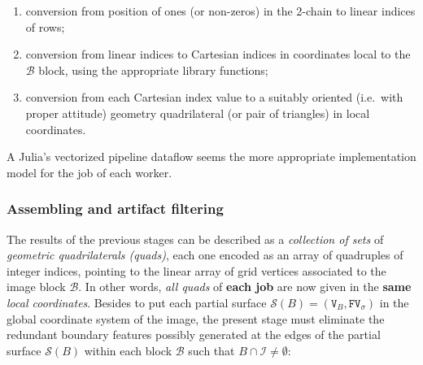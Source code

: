 \documentclass[11pt, oneside]{amsart}   	%
\begin{document}
\begin{enumerate}

\item conversion from position of ones (or non-zeros) in the 2-chain to linear indices of rows;

\item conversion from linear indices to Cartesian indices in coordinates local to the $\mathcal{B}$ block, using the appropriate library functions;

\item conversion from each Cartesian index value to a suitably oriented (i.e.~with proper attitude) geometry quadrilateral (or pair of triangles) in local coordinates.

\end{enumerate}

A Julia's vectorized pipeline dataflow seems the more appropriate implementation model for the job of each worker.

\subsubsection*{Assembling and artifact filtering}\label{sec:artifact-filtering}
The results of the previous stages can be described as a \emph{collection of sets} of \emph{geometric quadrilaterals (quads)}, each one encoded as an array of quadruples of integer indices, pointing to the linear array of grid vertices associated to the image block $\mathcal{B}$.  In other words, \emph{all quads} of \textbf{each job} are now given in the \textbf{same} \emph{local coordinates}.  Besides to put each partial surface $\mathcal{S}(B) = (\texttt{V}_B, \texttt{FV}_\sigma)$ in the global coordinate system of the image, the present stage must eliminate the redundant boundary features possibly generated at the edges of the partial surface $\mathcal{S}(B)$ within each block $\mathcal{B}$ such that $B \cap \mathcal{I} \not= \emptyset$:
\end{document}
